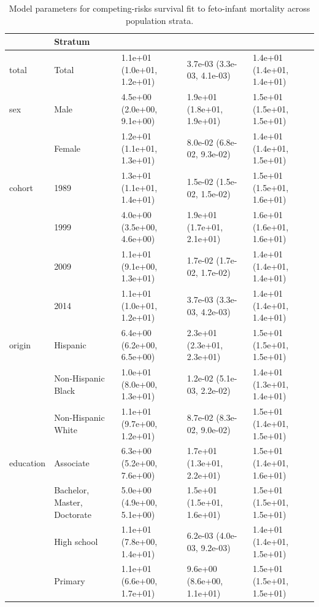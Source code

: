 \newpage

\begin{table}[t]
\caption*{
{\fontsize{20}{25}\selectfont  Model parameters for competing-risks survival fit to feto-infant mortality across population strata.\fontsize{12}{15}\selectfont }
} 
\fontsize{12.0pt}{14.0pt}\selectfont
\begin{tabular*}{\linewidth}{@{\extracolsep{\fill}}lllll}
\toprule
 & Stratum &  &  &  \\ 
\midrule\addlinespace[2.5pt]
total & Total & 1.1e+01 (1.0e+01, 1.2e+01) & 3.7e-03 (3.3e-03, 4.1e-03) & 1.4e+01 (1.4e+01, 1.4e+01) \\ 
sex & Male & 4.5e+00 (2.0e+00, 9.1e+00) & 1.9e+01 (1.8e+01, 1.9e+01) & 1.5e+01 (1.5e+01, 1.5e+01) \\ 
 & Female & 1.2e+01 (1.1e+01, 1.3e+01) & 8.0e-02 (6.8e-02, 9.3e-02) & 1.4e+01 (1.4e+01, 1.5e+01) \\ 
cohort & 1989 & 1.3e+01 (1.1e+01, 1.4e+01) & 1.5e-02 (1.5e-02, 1.5e-02) & 1.5e+01 (1.5e+01, 1.6e+01) \\ 
 & 1999 & 4.0e+00 (3.5e+00, 4.6e+00) & 1.9e+01 (1.7e+01, 2.1e+01) & 1.6e+01 (1.6e+01, 1.6e+01) \\ 
 & 2009 & 1.1e+01 (9.1e+00, 1.3e+01) & 1.7e-02 (1.7e-02, 1.7e-02) & 1.4e+01 (1.4e+01, 1.4e+01) \\ 
 & 2014 & 1.1e+01 (1.0e+01, 1.2e+01) & 3.7e-03 (3.3e-03, 4.2e-03) & 1.4e+01 (1.4e+01, 1.4e+01) \\ 
origin & Hispanic & 6.4e+00 (6.2e+00, 6.5e+00) & 2.3e+01 (2.3e+01, 2.3e+01) & 1.5e+01 (1.5e+01, 1.5e+01) \\ 
 & Non-Hispanic Black & 1.0e+01 (8.0e+00, 1.3e+01) & 1.2e-02 (5.1e-03, 2.2e-02) & 1.4e+01 (1.3e+01, 1.4e+01) \\ 
 & Non-Hispanic White & 1.1e+01 (9.7e+00, 1.2e+01) & 8.7e-02 (8.3e-02, 9.0e-02) & 1.5e+01 (1.4e+01, 1.5e+01) \\ 
education & Associate & 6.3e+00 (5.2e+00, 7.6e+00) & 1.7e+01 (1.3e+01, 2.2e+01) & 1.5e+01 (1.4e+01, 1.6e+01) \\ 
 & Bachelor, Master, Doctorate & 5.0e+00 (4.9e+00, 5.1e+00) & 1.5e+01 (1.5e+01, 1.6e+01) & 1.5e+01 (1.5e+01, 1.5e+01) \\ 
 & High school & 1.1e+01 (7.8e+00, 1.4e+01) & 6.2e-03 (4.0e-03, 9.2e-03) & 1.4e+01 (1.4e+01, 1.5e+01) \\ 
 & Primary & 1.1e+01 (6.6e+00, 1.7e+01) & 9.6e+00 (8.6e+00, 1.1e+01) & 1.5e+01 (1.5e+01, 1.5e+01) \\ 
\bottomrule
\end{tabular*}
\end{table}


